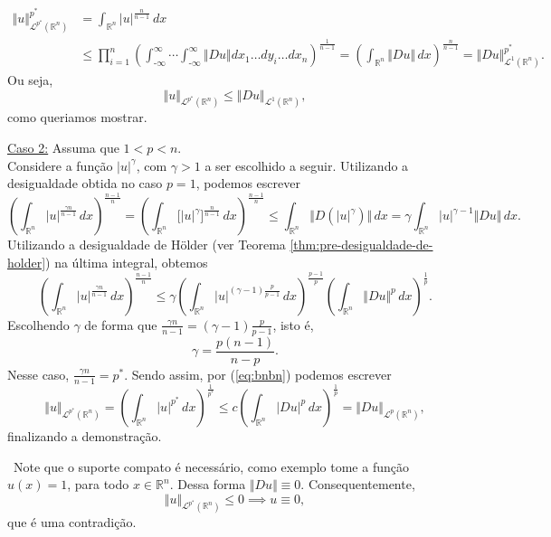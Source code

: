 \documentclass[a4paper, 11pt]{book}
\theoremstyle{definition}
\newcommand{\obs}{\noindent{\textbf{\textcolor{black}{\sffamily Observação:}}}~}
\newcommand{\m}{\text{-}}
\newcommand{\bR}{\mathbb{R}}
\newcommand{\cL}{\mathcal{L}}
\begin{document}
\begin{prf}
    \[
        \begin{aligned}
            \Vert u \Vert_{\cL^{p^*}(\bR^n)}^{p^*} &= \int_{\bR^n} |u|^{\frac{n}{n-1}} \, dx \\
            &\leqslant \prod_{i=1}^n \left( \int_{\m\infty}^{\infty} \cdots \int_{\m\infty}^\infty \Vert Du \Vert dx_1\dots dy_i \dots dx_n \right)^{\frac{1}{n-1}}
            = \left(\int_{\bR^n} \Vert Du \Vert\,dx\right)^{\frac{n}{n-1}} = \Vert Du \Vert_{\cL^1(\bR^n)}^{p^*}.
        \end{aligned}
    \]
    Ou seja,
    \begin{equation} \label{eq:desigualdadegnss}
        \Vert u \Vert_{\cL^{p^*}(\bR^n)} \leqslant\Vert Du \Vert_{\cL^1(\bR^n)},
    \end{equation}
    como queriamos mostrar.

    \underline{Caso 2:} Assuma que $1 < p < n$.\\
    Considere a função $|u|^\gamma$, com $\gamma > 1$ a ser escolhido a seguir. Utilizando a desigualdade obtida no caso $p = 1$, podemos escrever
    \[
        \left( \int_{\bR^n} |u|^{\frac{\gamma n}{n - 1}}  \, dx\right)^{\frac{n-1}{n}} = \left( \int_{\bR^n} \Big[ |u|^\gamma \Big]^{\frac{n}{n-1}} \,dx \right)^{\frac{n-1}{n}} \leqslant \int_{\bR^n} \Vert D(|u|^{\gamma}) \Vert \,dx = \gamma \int_{\bR^n} |u|^{\gamma-1} \Vert Du \Vert \,dx.
    \]
    Utilizando a desigualdade de Hölder (ver Teorema \ref{thm:pre-desigualdade-de-holder}) na última integral, obtemos
    \begin{equation} \label{eq:bnbn}
        \left( \int_{\bR^n} |u|^{\frac{\gamma n}{n - 1}}  \, dx\right)^{\frac{n-1}{n}} \leqslant \gamma\left( \int_{\bR^n} |u|^{(\gamma-1)\frac{p}{p-1}} \,dx \right)^{\frac{p-1}{p}} \left( \int_{\bR^n} \Vert Du \Vert^p \,dx \right)^{\frac{1}{p}}.
    \end{equation}
    Escolhendo $\gamma$ de forma que $\displaystyle\frac{\gamma n}{n - 1} = (\gamma -1)\frac{p}{p-1}$, isto é,
    \[
        \gamma = \frac{p(n-1)}{n-p}.
    \]
    Nesse caso, $\displaystyle\frac{\gamma n}{n-1} = p^*$. Sendo assim, por (\ref{eq:bnbn}) podemos escrever
    \[
        \Vert u \Vert_{\cL^{p^*}(\bR^n)} = \left( \int_{\bR^n} |u|^{p^*} \,dx \right)^{\frac{1}{p^*}} \leqslant c \left( \int_{\bR^n} |Du|^p \,dx\right)^{\frac{1}{p}} = \Vert Du \Vert_{\cL^p(\bR^n)},
    \]
    finalizando a demonstração.
\end{prf}

\obs Note que o suporte compato é necessário, como exemplo tome a função $u(x) = 1$, para todo $x \in \bR^n$. Dessa forma $\Vert Du \Vert \equiv 0$. Consequentemente,
\[
    \Vert u \Vert_{\cL^{p^*}(\bR^n)} \leqslant 0 \implies u \equiv 0,
\]
que é uma contradição.
\end{document}
